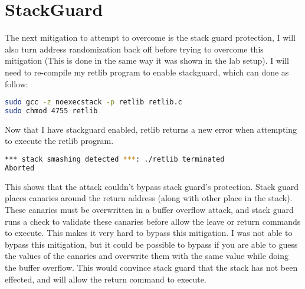 \documentclass[14pt]{extarticle}
\begin{document}
\section{StackGuard}
The next mitigation to attempt to overcome is the stack guard protection, I will also turn address randomization back off before trying to overcome this mitigation (This is done in the same way it was shown in the lab setup). I will need to re-compile my retlib program to enable stackguard, which can done as follow\cite{seed-retlibc}:
\begin{lstlisting}[language=sh]
sudo gcc -z noexecstack -p retlib retlib.c
sudo chmod 4755 retlib
\end{lstlisting}
Now that I have stackguard enabled, retlib returns a new error when attempting to execute the retlib program.
\begin{lstlisting}[language=sh]
*** stack smashing detected ***: ./retlib terminated
Aborted
\end{lstlisting}
This shows that the attack couldn't bypass stack guard's protection. Stack guard places canaries around the return address (along with other place in the stack). These canaries must be overwritten in a buffer overflow attack, and stack guard runs a check to validate these canaries before allow the leave or return commands to execute. This makes it very hard to bypass this mitigation. I was not able to bypass this mitigation, but it could be possible to bypass if you are able to guess the values of the canaries and overwrite them with the same value while doing the buffer overflow. This would convince stack guard that the stack has not been effected, and will allow the return command to execute.


\newpage


\end{document}
